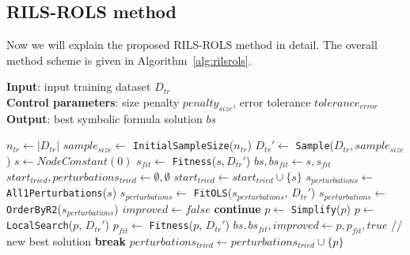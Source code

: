 \documentclass[a4paper,12pt]{elsarticle}
\begin{document}
 
 
\subsection{\textsc{RILS}-\textsc{ROLS}  method}
Now we will explain the proposed \textsc{RILS}-\textsc{ROLS}  method in detail. The overall method scheme is given in Algorithm~\ref{alg:rilsrols}.   

\begin{algorithm}
	\footnotesize
	\hspace*{\algorithmicindent} \textbf{Input}: input training dataset $D_{tr}$ \\
	\hspace*{\algorithmicindent} \textbf{Control parameters}: size penalty $penalty_{size}$, error tolerance $tolerance_{error}$ \\
	\hspace*{\algorithmicindent} \textbf{Output}: best symbolic formula solution $bs$
	\begin{algorithmic}[1] 
		\State $n_{tr} \gets |D_{tr}|$
		\State $sample_{size} \gets $ \texttt{InitialSampleSize}($n_{tr}$)
		\State $D_{tr}' \gets$ \texttt{Sample}($D_{tr}, sample_{size}$)
		\State $s \gets NodeConstant(0)$ 
		\State $s_{fit} \gets$ \texttt{Fitness}($s, D_{tr}'$)
		\State $bs, bs_{fit} \gets s, s_{fit}$ \label{line:solSet}
		\State $start_{tried}, perturbations_{tried} \gets \emptyset, \emptyset$
		\State $start_{tried} \gets start_{tried} \cup \{s\}$
		\State $s_{perturbations} \gets $ \texttt{All1Perturbations}($s$) \label{line:sPert}
		\State $s_{perturbations} \gets $ \texttt{FitOLS}($s_{perturbations}$, $D_{tr}'$)
		\State $s_{perturbations} \gets $ \texttt{OrderByR2}($s_{perturbations}$) \label{line:orderR2}
		\State $improved \gets false $
		\State \textbf{continue}
		\EndIf
		\State $p \gets $ \texttt{Simplify}($p$) \label{line:simp}
		\State $p \gets $ \texttt{LocalSearch}($p$, $D_{tr}'$) \label{line:ls}
		\State $p_{fit} \gets$ \texttt{Fitness}($p$, $D_{tr}'$)
		 \label{line:avoid1}
		\State $bs, bs_{fit}, improved \gets p, p_{fit}, true$ // new best solution
		\State \textbf{break}
		\EndIf \label{line:avoid2}
		\State $perturbations_{tried} \gets perturbations_{tried} \cup \{p\}$

\end{algorithmic}
\end{algorithm}
\end{document}
